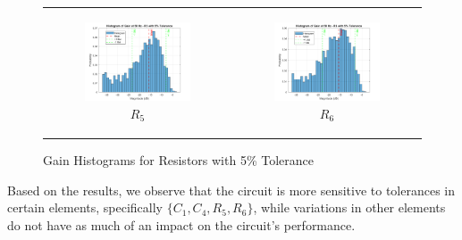 \documentclass[hidelinks,12pt]{article}
\begin{document}
\begin{figure}[!h]
\begin{tabular}{cc}
			\begin{subfigure}[h]{0.45\textwidth}
				\centering
				\includegraphics[width=\textwidth]{figures/5_percent/r5.png}
				\caption{$R_5$}
			\end{subfigure} &
			\begin{subfigure}[h]{0.45\textwidth}
				\centering
				\includegraphics[width=\textwidth]{figures/5_percent/r6.png}
				\caption{$R_6$}
			\end{subfigure}
		\end{tabular}
		\caption{Gain Histograms for Resistors with 5\% Tolerance}
		\label{fig:resistors_5_percent}
	\end{figure}
	

	Based on the results, we observe that the circuit is more sensitive to tolerances in certain elements, specifically \( \{C_1, C_4, R_5, R_6\} \), while variations in other elements do not have as much of an impact on the circuit's performance.
	
\end{document}
